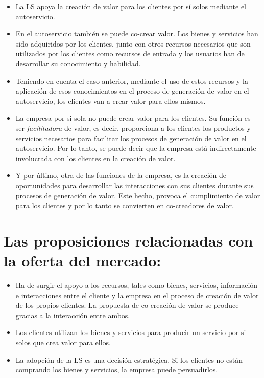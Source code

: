 \begin{itemize}
	\item La LS apoya la creación de valor para los clientes por sí solos mediante el autoservicio.
	\item En el autoservicio también se puede co-crear valor. Los bienes y servicios han sido adquiridos por los clientes, junto con otros recursos necesarios que son utilizados por los clientes como recursos de entrada y los usuarios han de desarrollar su conocimiento y habilidad.
	\item Teniendo en cuenta el caso anterior, mediante el uso de estos recursos y la aplicación de esos conocimientos en el proceso de generación de valor en el autoservicio, los clientes van a crear valor para ellos mismos.
	\item La empresa por si sola no puede crear valor para los clientes. Su función es ser \emph{facilitadora} de valor, es decir, proporciona a los clientes los productos y servicios necesarios para facilitar los procesos de generación de valor en el autoservicio. Por lo tanto, se puede decir que la empresa está indirectamente involucrada con los clientes en la creación de valor.
	\item Y por último, otra de las funciones de la empresa, es la creación de oportunidades para desarrollar las interacciones con sus clientes durante sus procesos de generación de valor. Este hecho, provoca el cumplimiento de valor para los clientes y por lo tanto se convierten en co-creadores de valor.
\end{itemize}

\section{Las proposiciones relacionadas con la oferta del mercado:}

\begin{itemize}
	\item Ha de surgir el apoyo a los recursos, tales como bienes, servicios, información e interacciones entre el cliente y la empresa en el proceso de creación de valor de los propios clientes. La propuesta de co-creación de valor se produce gracias a la interacción entre ambos.
	\item Los clientes utilizan los bienes y servicios para producir un servicio por si solos que crea valor para ellos.
	\item La adopción de la LS es una decisión estratégica. Si los clientes no están comprando los bienes y servicios, la empresa puede persuadirlos.

\end{itemize}

